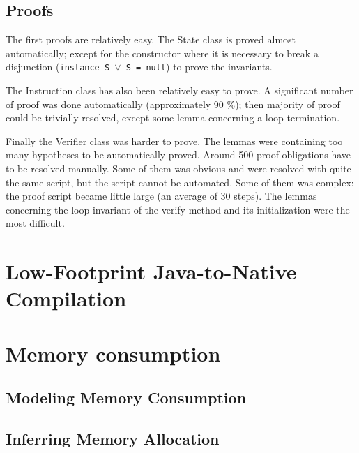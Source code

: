 \subsection{Proofs}
The first proofs are relatively easy. 
The State class is proved almost automatically; 
except for the constructor where it is necessary to break a disjunction ({\tt instance S $\vee$ S = null}) to prove the invariants.

The Instruction class has also been relatively easy to prove. 
A significant number of proof was done automatically (approximately 90 \%); 
then majority of proof could be trivially resolved, except some lemma concerning  a loop termination.    

Finally the Verifier class was harder to prove.
The lemmas were containing too many hypotheses to be automatically proved.
Around 500 proof obligations have to be resolved manually.
Some of them was obvious and were resolved with quite the same script, but the script cannot be automated.
Some of them was complex: the proof script became little large (an average of 30 steps).
The lemmas concerning the loop invariant of the verify method and its initialization were the most difficult.
\section{Low-Footprint Java-to-Native Compilation}

\section{Memory consumption}

%
\subsection{Modeling Memory Consumption}\label{sec:verif}

\subsection{Inferring Memory Allocation}\label{sec:infer}

%

